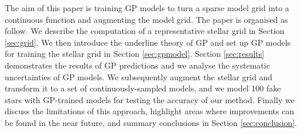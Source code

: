The aim of this paper is training GP models to turn a sparse model grid into a continuous function and augmenting the model grid. The paper is organised as follow. We describe the computation of a representative stellar grid in Section \ref{sec:grid}. We then introduce the underline theory of GP and set up GP models for training the stellar grid in Section \ref{sec:gpmodel}. Section \ref{sec:results} demonstrates the results of GP predictions and we analyse the systematic uncertainties of GP models. We subsequently augment the stellar grid and transform it to a set of continuously-sampled models, and we model 100 fake stars with GP-trained models for testing the accuracy of our method. 
Finally we discuss the limitations of this approach, highlight areas where improvements can be found in the near future, and summary conclusions in Section \ref{sec:conclusion}.










